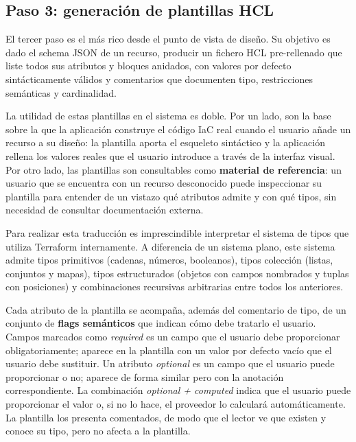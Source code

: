 \documentclass{article}
\begin{document}
{        \subsection{Paso 3: generación de plantillas HCL}
        \justify
        El tercer paso es el más rico desde el punto de vista de diseño. Su objetivo
        es dado el schema JSON de un recurso, producir un fichero
        HCL pre-rellenado que liste todos sus atributos y bloques anidados, con
        valores por defecto sintácticamente válidos y comentarios que documenten
        tipo, restricciones semánticas y cardinalidad.

        \justify
        La utilidad de estas plantillas en el sistema es doble. Por un lado, son la
        base sobre la que la aplicación construye el código IaC real cuando el
        usuario añade un recurso a su diseño: la plantilla aporta el esqueleto
        sintáctico y la aplicación rellena los valores reales que el usuario introduce
        a través de la interfaz visual. Por otro lado, las plantillas son
        consultables como \textbf{material de referencia}: un usuario que se encuentra
        con un recurso desconocido puede inspeccionar su plantilla para entender de un
        vistazo qué atributos admite y con qué tipos, sin necesidad de consultar
        documentación externa.

        \justify
        Para realizar esta traducción es imprescindible interpretar el sistema de
        tipos que utiliza Terraform internamente. A diferencia de un sistema plano,
        este sistema admite tipos primitivos (cadenas, números, booleanos), tipos
        colección (listas, conjuntos y mapas), tipos estructurados (objetos con
        campos nombrados y tuplas con posiciones) y combinaciones recursivas
        arbitrarias entre todos los anteriores. 

        \justify
        Cada atributo de la plantilla se acompaña, además del comentario de tipo, de
        un conjunto de \textbf{flags semánticos} que indican cómo debe tratarlo el
        usuario. Campos marcados como \textit{required} es un campo que el usuario debe proporcionar
        obligatoriamente; aparece en la plantilla con un valor por defecto vacío que
        el usuario debe sustituir. Un atributo \textit{optional} es un campo que el
        usuario puede proporcionar o no; aparece de forma similar pero con la
        anotación correspondiente. La combinación \textit{optional + computed} indica
        que el usuario puede proporcionar el valor o, si no lo hace, el proveedor lo
        calculará automáticamente. La plantilla los presenta comentados, de modo que el
        lector ve que existen y conoce su tipo, pero no afecta a la plantilla.

}
\end{document}
